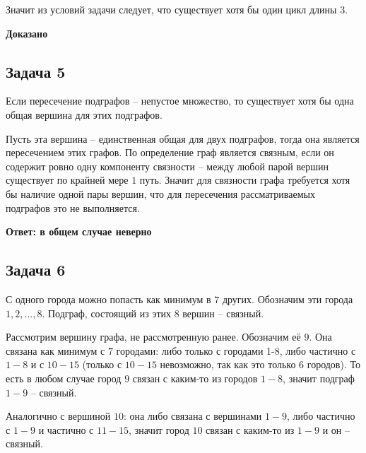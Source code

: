 \documentclass[a4paper,12pt]{article} %
\begin{document}
Значит из условий задачи следует, что существует хотя бы один цикл длины $3$.

\begin{flushright}
\begin{large}
\textbf {Доказано}
\end{large}
\end{flushright}


\begin{center}
\section*{Задача 5}
\end{center}

Если пересечение подграфов -- непустое множество, то существует хотя бы одна общая вершина для этих подграфов.

Пусть эта вершина -- единственная общая для двух подграфов, тогда она является пересечением этих графов. По определение граф является связным, если он содержит ровно одну компоненту связности -- между любой парой вершин существует по крайней мере $1$ путь. Значит для связности графа требуется хотя бы наличие одной пары вершин, что для пересечения рассматриваемых подграфов это не выполняется.

\begin{flushright}
\begin{large}
\textbf {Ответ: в общем случае неверно}
\end{large}
\end{flushright}
\newpage
\begin{center}
\section*{Задача 6}
\end{center}

С одного города можно попасть как минимум в $7$ других. Обозначим эти города $1, 2, ..., 8$. Подграф, состоящий из этих $8$ вершин -- связный.

Рассмотрим вершину графа, не рассмотренную ранее. Обозначим её $9$. Она связана как минимум с $7$ городами: либо только с городами 1-8, либо частично с $1-8$ и с $10-15$ (только с $10-15$ невозможно, так как это только 6 городов). То есть в любом случае город $9$ связан с каким-то из городов $1-8$, значит подграф $1-9$ -- связный.

Аналогично с вершиной $10$: она либо связана с вершинами $1-9$, либо частично с $1-9$ и частично с $11-15$, значит город $10$ связан с каким-то из $1-9$ и он -- связный.
\end{document}
